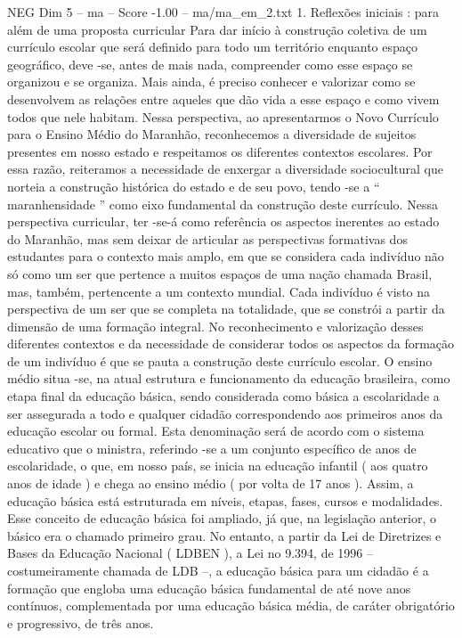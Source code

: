 \begin{textsample}{NEG Dim 5 – ma – Score -1.00 – ma/ma\_em\_2.txt}  \label{ex:f5_neg_119}
1.
Reflexões iniciais : para além de uma proposta curricular Para dar início à construção coletiva de um currículo escolar que será definido para todo um território enquanto espaço geográfico, deve -se, antes de mais nada, compreender como esse espaço se organizou e se organiza.
Mais ainda, é preciso conhecer e valorizar como se desenvolvem as relações entre aqueles que dão vida a esse espaço e como vivem todos que nele habitam.
Nessa perspectiva, ao apresentarmos o Novo Currículo para o Ensino Médio do Maranhão, reconhecemos a diversidade de sujeitos presentes em nosso estado e respeitamos os diferentes contextos escolares.
Por essa razão, reiteramos a necessidade de enxergar a diversidade sociocultural que norteia a construção histórica do estado e de seu povo, tendo -se a “ maranhensidade ” como eixo fundamental da construção deste currículo.
Nessa perspectiva curricular, ter -se-á como referência os aspectos inerentes ao estado do Maranhão, mas sem deixar de articular as perspectivas formativas dos estudantes para o contexto mais amplo, em que se considera cada indivíduo não só como um ser que pertence a muitos espaços de uma nação chamada Brasil, mas, também, pertencente a um contexto mundial.
Cada indivíduo é visto na perspectiva de um ser que se completa na totalidade, que se constrói a partir da dimensão de uma formação integral.
No reconhecimento e valorização desses diferentes contextos e da necessidade de considerar todos os aspectos da formação de um indivíduo é que se pauta a construção deste currículo escolar.
O ensino médio situa -se, na atual estrutura e funcionamento da educação brasileira, como etapa final da educação básica, sendo considerada como básica a escolaridade a ser assegurada a todo e qualquer cidadão correspondendo aos primeiros anos da educação escolar ou formal.
Esta denominação será de acordo com o sistema educativo que o ministra, referindo -se a um conjunto específico de anos de escolaridade, o que, em nosso país, se inicia na educação infantil ( aos quatro anos de idade ) e chega ao ensino médio ( por volta de 17 anos ).
Assim, a educação básica está estruturada em níveis, etapas, fases, cursos e modalidades.
Esse conceito de educação básica foi ampliado, já que, na legislação anterior, o básico era o chamado primeiro grau.
No entanto, a partir da Lei de Diretrizes e Bases da Educação Nacional ( LDBEN ), a Lei no 9.394, de 1996 – costumeiramente chamada de LDB –, a educação básica para um cidadão é a formação que engloba uma educação básica fundamental de até nove anos contínuos, complementada por uma educação básica média, de caráter obrigatório e progressivo, de três anos.

\end{textsample}
